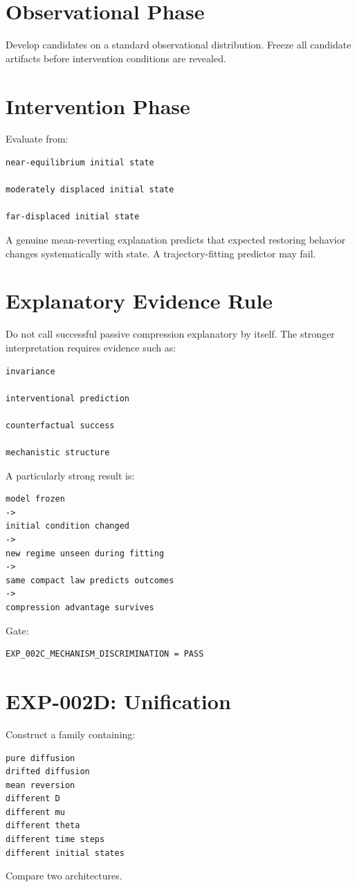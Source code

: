 \documentclass[11pt]{article}
\begin{document}
\section{Observational Phase}

Develop candidates on a standard observational distribution. Freeze all candidate artifacts before intervention conditions are revealed.

\section{Intervention Phase}

Evaluate from:
\begin{verbatim}
near-equilibrium initial state

moderately displaced initial state

far-displaced initial state
\end{verbatim}
A genuine mean-reverting explanation predicts that expected restoring behavior changes systematically with state. A trajectory-fitting predictor may fail.

\section{Explanatory Evidence Rule}

Do not call successful passive compression explanatory by itself. The stronger interpretation requires evidence such as:
\begin{verbatim}
invariance

interventional prediction

counterfactual success

mechanistic structure
\end{verbatim}
A particularly strong result is:
\begin{verbatim}
model frozen
->
initial condition changed
->
new regime unseen during fitting
->
same compact law predicts outcomes
->
compression advantage survives
\end{verbatim}
Gate:
\begin{verbatim}
EXP_002C_MECHANISM_DISCRIMINATION = PASS
\end{verbatim}

\section{EXP-002D: Unification}

Construct a family containing:
\begin{verbatim}
pure diffusion
drifted diffusion
mean reversion
different D
different mu
different theta
different time steps
different initial states
\end{verbatim}
Compare two architectures.
\end{document}
